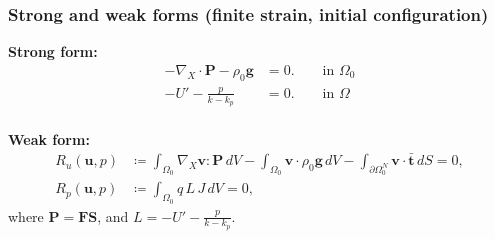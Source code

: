 \documentclass{beamer}
\newcommand{\bm}{\boldsymbol}
\newcommand\bu{\bm u}
\newcommand\bulk{k}
\newcommand\tcolon{\!:\!}
\begin{document}
\begin{frame}
	\frametitle{Strong and weak forms (finite strain, initial configuration)}

	\textbf{Strong form:}
	\begin{equation}
		\begin{split}
			-\nabla_X \cdot \bm P - \rho_0 \bm g   &= 0. \qquad \text{in $\Omega_0$}  \\ \nonumber
			-U' - \frac{p}{\bulk - \bulk_p} &= 0. \qquad \text{in $\Omega$} \\
		\end{split}
	\end{equation}

	\textbf{Weak form:}
	\begin{equation}\label{eq:general-mixed-hyper-weak-form}
		\begin{split}
			R_u(\bu, p) &\coloneqq \int_{\Omega_0} \nabla_X \bm v \tcolon \bm P \, dV - \int_{\Omega_0}\bm v \cdot \rho_0 \bm g \,dV - \int_{\partial \Omega^{N}_0} \bm v \cdot \bar{\bm t} \, dS = 0, \\ \nonumber
			R_p(\bu, p) &\coloneqq \int_{\Omega_0} q \, L \, J \, dV = 0,
		\end{split}
	\end{equation}
	where $\bm P = \bm F \bm S$, and $L = -U' - \frac{p}{\bulk - \bulk_p}$.

\end{frame}
\end{document}
